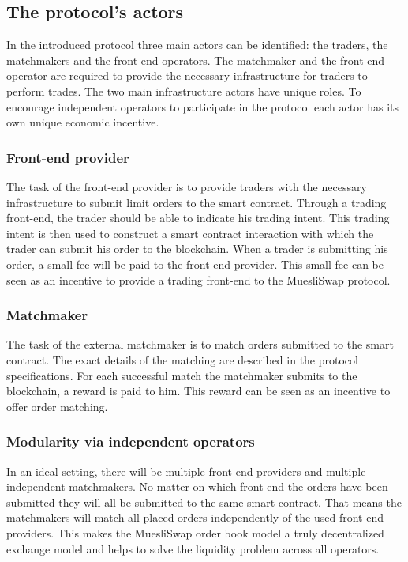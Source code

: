 \documentclass[11pt]{article}
\begin{document}
\subsection{The protocol's actors}\label{three-actors}

In the introduced protocol three main actors can be identified: the traders, the matchmakers and the front-end operators. The matchmaker and the front-end operator are required to provide the necessary infrastructure for traders to perform trades. The two main infrastructure actors have unique roles. To encourage independent operators to participate in the protocol each actor has its own unique economic incentive. 

\subsubsection{Front-end provider} 
The task of the front-end provider is to provide traders with the necessary infrastructure to submit limit orders to the smart contract. Through a trading front-end, the trader should be able to indicate his trading intent. This trading intent is then used to construct a smart contract interaction with which the trader can submit his order to the blockchain. When a trader is submitting his order, a small fee will be paid to the front-end provider. This small fee can be seen as an incentive to provide a trading front-end to the MuesliSwap protocol. 

\subsubsection{Matchmaker}
The task of the external matchmaker is to match orders submitted to the smart contract. The exact details of the matching are described in the protocol specifications. For each successful match the matchmaker submits to the blockchain, a reward is paid to him. This reward can be seen as an incentive to offer order matching. 


\subsubsection{Modularity via independent operators}

In an ideal setting, there will be multiple front-end providers and multiple independent matchmakers. No matter on which front-end the orders have been submitted they will all be submitted to the same smart contract. That means the matchmakers will match all placed orders independently of the used front-end providers. This makes the MuesliSwap order book model a truly decentralized exchange model and helps to solve the liquidity problem across all operators. 
\end{document}
